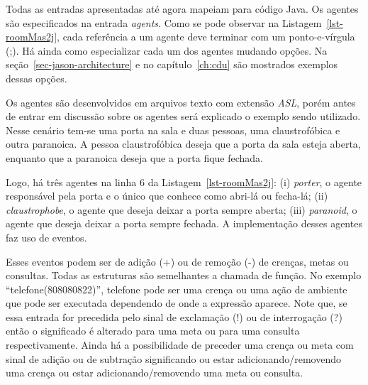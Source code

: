 Todas as entradas apresentadas até agora mapeiam para código Java.
Os agentes são especificados na entrada \emph{agents}. Como se pode
observar na Listagem~\ref{lst-roomMas2j}, cada referência a um agente deve
terminar com um ponto-e-vírgula (;). Há ainda como especializar cada um dos
agentes mudando opções. Na seção~\ref{sec-jason-architecture} e no
capítulo~\ref{ch:cdu} são mostrados exemplos dessas opções.

Os agentes são desenvolvidos em arquivos texto com extensão \emph{ASL}, porém
antes de entrar em discussão sobre os agentes será explicado o exemplo sendo
utilizado. Nesse cenário tem-se uma porta na sala e duas pessoas, uma
claustrofóbica e outra paranoica. A pessoa claustrofóbica deseja que a
porta da sala esteja aberta, enquanto que a paranoica deseja que a porta
fique fechada.

Logo, há três agentes na linha 6 da Listagem~\ref{lst-roomMas2j}:
(i) \emph{porter}, o agente responsável pela porta e o único que conhece
como abri-lá ou fecha-lá;
(ii) \emph{claustrophobe}, o agente que deseja deixar a porta sempre aberta;
(iii) \emph{paranoid}, o agente que deseja deixar a porta sempre fechada.
A implementação desses agentes faz uso de eventos.

Esses eventos podem ser de adição (+) ou de remoção (-) de crenças, metas ou
consultas. Todas as estruturas são semelhantes a chamada de função. No
exemplo ``telefone(808080822)'', telefone pode ser uma crença ou uma ação de
ambiente que pode ser executada dependendo de onde a expressão aparece.
Note que, se essa entrada for precedida pelo sinal de exclamação (!) ou de
interrogação (?) então o significado é alterado para uma meta ou para uma
consulta respectivamente. Ainda há a possibilidade de preceder uma crença ou
meta com sinal de adição ou de subtração significando ou estar
adicionando/removendo uma crença ou estar adicionando/removendo uma meta ou
consulta.

